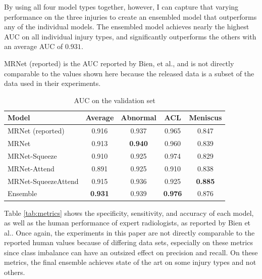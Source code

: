 \documentclass[10pt,twocolumn,letterpaper]{article}
\begin{document}
By using all four model types together, however, I can capture that varying performance on the three injuries to create an ensembled model that outperforms any of the individual models. The ensembled model achieves nearly the highest AUC on all individual injury types, and significantly outperforms the others with an average AUC of $0.931$.

MRNet (reported) is the AUC reported by Bien, et al.\cite{bien2018deep}, and is not directly comparable to the values shown here because the released data is a subset of the data used in their experiments.

\begin{table}[h!]
\begin{center}
\begin{tabular}{|l|c|c|c|c|}
\hline
Model & Average & Abnormal & ACL & Meniscus \\
\hline
MRNet (reported) & 0.916 & 0.937 & 0.965 & 0.847 \\
\hline
MRNet & 0.913 & \textbf{0.940} & 0.960 & 0.839 \\
MRNet-Squeeze & 0.910 & 0.925 & 0.974 & 0.829 \\
MRNet-Attend & 0.891 & 0.925 & 0.910 & 0.838 \\
MRNet-SqueezeAttend & 0.915 & 0.936 & 0.925 & \textbf{0.885}\\
\hline
Ensemble & \textbf{0.931} & 0.939 & \textbf{0.976} & 0.876 \\
\hline
\end{tabular}
\end{center}
\caption{AUC on the validation set}
\label{tab:results}
\end{table}

Table \ref{tab:metrics} shows the specificity, sensitivity, and accuracy of each model, as well as the human performance of expert radiologists, as reported by Bien et al.\cite{bien2018deep}. Once again, the experiments in this paper are not directly comparable to the reported human values because of differing data sets, especially on these metrics since class imbalance can have an outsized effect on precision and recall. On these metrics, the final ensemble achieves state of the art on some injury types and not others.
\end{document}
